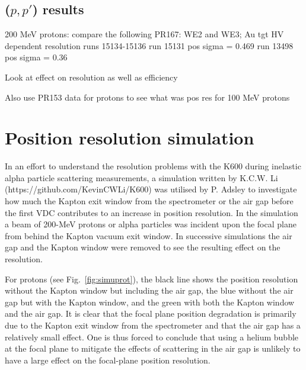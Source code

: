 \documentclass[11pt]{report}
\begin{document}
\subsection{($p,p'$) results}\label{subsubsec:posres}


\bigskip

200 MeV protons:
compare the following PR167: WE2  and WE3; Au tgt
HV dependent resolution runs 15134-15136
run 15131 pos sigma = 0.469
run 13498 pos sigma = 0.36

Look at effect on resolution as well as efficiency



Also use PR153 data for protons to see what was pos res
for 100 MeV protons



\section{Position resolution simulation}

In an effort to understand the resolution problems with the K600 during inelastic alpha particle scattering measurements, a simulation written by K.C.W. Li (https://github.com/KevinCWLi/K600) was utilised by P. Adsley to investigate how much the Kapton exit window from the spectrometer or the air gap before the first VDC contributes to an increase in position resolution. In the simulation a beam of 200-MeV protons or alpha particles was incident upon the focal plane from behind the Kapton vacuum exit window. In successive simulations the air gap and the Kapton window were removed to see the resulting effect on the resolution.

For protons (see Fig.~\ref{fig:simuprot}), the black line shows the position resolution without the Kapton window but including the air gap, the blue without the air gap but with the Kapton window, and the green with both the Kapton window and the air gap. It is clear that the focal plane position degradation is primarily due to the Kapton exit window from the spectrometer and that the air gap has a relatively small effect. One is thus forced to conclude that using a helium bubble at the focal plane to mitigate the effects of scattering in the air gap is unlikely to have a large effect on the focal-plane position resolution.
\end{document}
